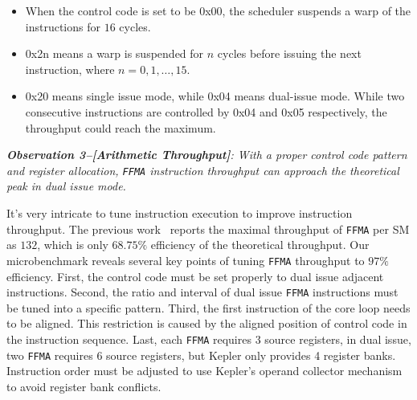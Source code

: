 \begin{itemize}
\item When the control code is set to be 0x00, the scheduler suspends a warp of the instructions for $16$ cycles.
\item 0x2n means a warp is suspended for $n$ cycles before issuing the next instruction, where $n=0, 1,\dots, 15$.
\item 0x20 means single issue mode, while 0x04 means dual-issue mode.
While two consecutive instructions are controlled by 0x04 and 0x05 respectively, the throughput could reach the maximum.
\end{itemize}

{\em {\bf Observation 3--[Arithmetic Throughput]}:
With a proper control code pattern and register allocation, {\tt FFMA}
instruction throughput can approach the theoretical peak in dual issue mode.}

It's very intricate to tune instruction execution to improve instruction throughput. The previous work~\cite{lai}
reports the maximal throughput of {\tt FFMA} per SM as $132$, which is only $68.75\%$ efficiency of the theoretical
throughput. Our microbenchmark reveals several key points of tuning {\tt FFMA} throughput to $97\%$ efficiency.
First, the control code must be set properly to dual issue adjacent instructions. 
Second, the ratio and interval of dual issue {\tt FFMA} instructions must be tuned into a specific pattern.
Third, the first instruction of the core loop needs to be aligned. This restriction is
caused by the aligned position of control code in the instruction sequence.
Last, each {\tt FFMA} requires $3$ source registers, in dual issue, two {\tt FFMA} requires $6$ source registers, but
Kepler only provides 4 register banks.
Instruction order must be adjusted to use Kepler's operand collector mechanism~\cite{collector,tarjan2012policy} to avoid register bank conflicts. 

